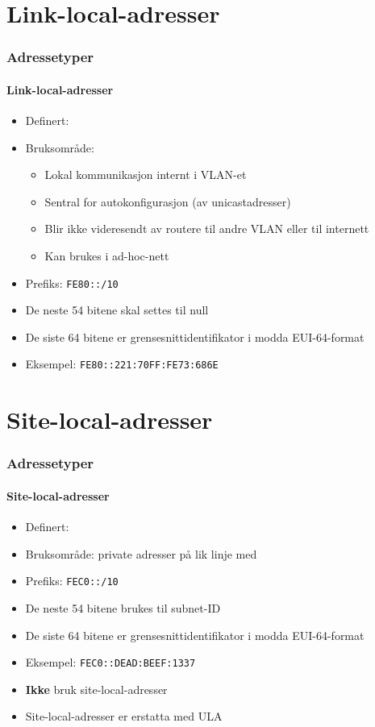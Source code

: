 \section{Link-local-adresser}
\begin{frame}%
  \frametitle{Adressetyper}
  \framesubtitle{Link-local-adresser}
  \begin{itemize}%
  \item Definert: 
  \item Bruksområde:
    \begin{itemize}%
    \item Lokal kommunikasjon internt i VLAN-et
    \item Sentral for autokonfigurasjon (av unicastadresser)
    \item Blir ikke videresendt av routere til andre VLAN eller til internett
    \item Kan brukes i ad-hoc-nett
    \end{itemize}
  \item Prefiks: \texttt{FE80::/10}
  \item De neste 54 bitene skal settes til null
  \item De siste 64 bitene er grensesnittidentifikator i modda
    EUI-64-format
  \item Eksempel: \texttt{FE80::221:70FF:FE73:686E}
  \end{itemize}
\end{frame}

\section{Site-local-adresser}
\begin{frame}%
  \frametitle{Adressetyper}
  \framesubtitle{Site-local-adresser}
  \begin{itemize}%
  \item Definert: 
  \item Bruksområde: private adresser på lik linje med 
  \item Prefiks: \texttt{FEC0::/10}
  \item De neste 54 bitene brukes til subnet-ID
  \item De siste 64 bitene er grensesnittidentifikator i modda
    EUI-64-format
  \item Eksempel: \texttt{FEC0::DEAD:BEEF:1337}
  \item \textbf{Ikke} bruk site-local-adresser 
  \item Site-local-adresser er erstatta med ULA 
  \end{itemize}
\end{frame}

